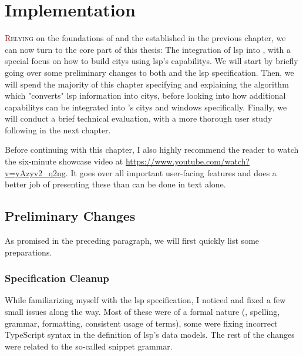 \documentclass[../thesis]{subfiles}
\begin{document}
\chapter{Implementation}\label{ch:implementation}

\lettrine[lines=3]{\textcolor{Maroon}{R}}{elying} on the foundations of \SEE{} and the  established in the previous chapter, we can now turn to the core part of this thesis:
The integration of \gls{lsp} into \SEE{}, with a special focus on how to build \glspl{city} using \gls{lsp}'s \glspl{capability}.
We will start by briefly going over some preliminary changes to both \SEE{} and the \gls{lsp} specification.
Then, we will spend the majority of this chapter specifying and explaining the algorithm which "converts" \gls{lsp} information into \glspl{city}, before looking into how additional \glspl{capability} can be integrated into \SEE{}'s \glspl{city} and \glspl{window} specifically.
Finally, we will conduct a brief technical evaluation, with a more thorough user study following in the next chapter.

Before continuing with this chapter, I also highly recommend the reader to watch the six-minute showcase video at \url{https://www.youtube.com/watch?v=yAzyv2_q2ng}.
It goes over all important user-facing features and does a better job of presenting these than can be done in text alone.

\section{Preliminary Changes}
As promised in the preceding paragraph, we will first quickly list some preparations.

\subsection{Specification Cleanup}
While familiarizing myself with the \gls{lsp} specification, I noticed and fixed a few small issues along the way.
Most of these were of a formal nature (\eg, spelling, grammar, formatting, consistent usage of terms), some were fixing incorrect TypeScript syntax in the definition of \gls{lsp}'s data models.
The rest of the changes were related to the so-called snippet grammar.
\end{document}
